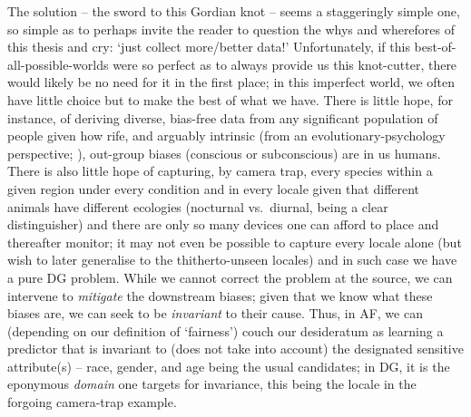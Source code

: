 %
%
The solution -- the sword to this Gordian knot -- seems a staggeringly simple one, so simple as to
perhaps invite the reader to question the whys and wherefores of this thesis and cry: `just collect
more/better data!'
%
Unfortunately, if this best-of-all-possible-worlds were so perfect as to always provide us this
knot-cutter, there would likely be no need for it in the first place; in this imperfect world, we
often have little choice but to make the best of what we have. 
%
There is little hope, for instance, of deriving diverse, bias-free data from any significant
population of people given how rife, and arguably intrinsic (from an evolutionary-psychology
perspective; \citealp{kurzban2001evolutionary}), out-group biases (conscious or subconscious) are
in us humans.
%
There is also little hope of capturing, by camera trap, every species within a given region under
every condition and in every locale given that different animals have different ecologies
(nocturnal vs.\ diurnal, being a clear distinguisher) and there are only so many devices one can
afford to place and thereafter monitor; it may not even be possible to capture every locale alone
(but wish to later generalise to the thitherto-unseen locales) and in such case we have a pure
\ac{DG} problem.
%
While we cannot correct the problem at the source, we can intervene to \emph{mitigate} the
downstream biases; given that we know what these biases are, we can seek to be \emph{invariant} to
their cause.
%
Thus, in \ac{AF}, we can (depending on our definition of `fairness') couch our desideratum as learning a
predictor that is invariant to (does not take into account) the designated sensitive attribute(s)
-- race, gender, and age being the usual candidates; in \ac{DG}, it is the eponymous \emph{domain} one
targets for invariance, this being the locale in the forgoing camera-trap example.

